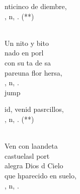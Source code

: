 \begin{cancion}%
	\begin{chorus}%
	nticinco de diembre,\\
	, n, . (**)\\
	\end{chorus}%
	\jump\\
	Un nito y bito \\
	 nado en  porl\\
	con su ta de sa\\
	pareuna flor hersa,\\
	, n, .\\jump\\
	\begin{chorus}%
	id, venid pasrcillos,\\
	, n, . (**)\\
	\end{chorus}%
	\jump\\
	Ven con laandeta\\
	castuelasl port \\
	alegra Dios d Cielo\\
	que hparecido en  suelo,\\
	, n, .\\
\end{cancion}%
